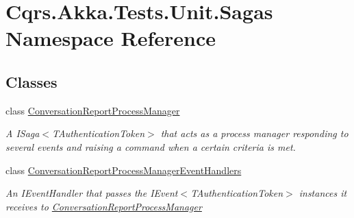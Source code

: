 \hypertarget{namespaceCqrs_1_1Akka_1_1Tests_1_1Unit_1_1Sagas}{}\section{Cqrs.\+Akka.\+Tests.\+Unit.\+Sagas Namespace Reference}
\label{namespaceCqrs_1_1Akka_1_1Tests_1_1Unit_1_1Sagas}
\subsection*{Classes}
\begin{DoxyCompactItemize}
\item 
class \hyperlink{classCqrs_1_1Akka_1_1Tests_1_1Unit_1_1Sagas_1_1ConversationReportProcessManager}{Conversation\+Report\+Process\+Manager}
\begin{DoxyCompactList}\small\item\em A I\+Saga$<$\+T\+Authentication\+Token$>$ that acts as a process manager responding to several events and raising a command when a certain criteria is met. \end{DoxyCompactList}\item 
class \hyperlink{classCqrs_1_1Akka_1_1Tests_1_1Unit_1_1Sagas_1_1ConversationReportProcessManagerEventHandlers}{Conversation\+Report\+Process\+Manager\+Event\+Handlers}
\begin{DoxyCompactList}\small\item\em An I\+Event\+Handler that passes the I\+Event$<$\+T\+Authentication\+Token$>$ instances it receives to \hyperlink{classCqrs_1_1Akka_1_1Tests_1_1Unit_1_1Sagas_1_1ConversationReportProcessManager}{Conversation\+Report\+Process\+Manager} \end{DoxyCompactList}\end{DoxyCompactItemize}
